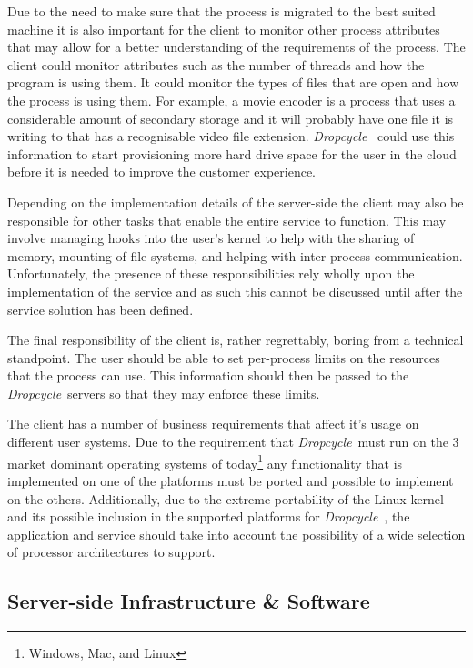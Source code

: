 \documentclass[12pt, a4paper]{article}
\def\dropcycle{\emph{Dropcycle}\ }
\begin{document}
Due to the need to make sure that the process is migrated to the best suited
machine it is also important for the client to monitor other process attributes
that may allow for a better understanding of the requirements of the process.
The client could monitor attributes such as the number of threads and how the
program is using them. It could monitor the types of files that are open and
how the process is using them. For example, a movie encoder is a process that
uses a considerable amount of secondary storage and it will probably have one
file it is writing to that has a recognisable video file extension. \dropcycle
could use this information to start provisioning more hard drive space for the
user in the cloud before it is needed to improve the customer experience.

Depending on the implementation details of the server-side the client may also
be responsible for other tasks that enable the entire service to function. This
may involve managing hooks into the user's kernel to help with the sharing of
memory, mounting of file systems, and helping with inter-process communication.
Unfortunately, the presence of these responsibilities rely wholly upon the
implementation of the service and as such this cannot be discussed until after
the service solution has been defined.

The final responsibility of the client is, rather regrettably, boring from
a technical standpoint. The user should be able to set per-process limits on
the resources that the process can use. This information should then be passed
to the \dropcycle servers so that they may enforce these limits.

The client has a number of business requirements that affect it's usage on
different user systems. Due to the requirement that \dropcycle must run on the
3 market dominant operating systems of today\footnote{Windows, Mac, and Linux}
any functionality that is implemented on one of the platforms must be ported
and possible to implement on the others. Additionally, due to the extreme
portability of the Linux kernel and its possible inclusion in the supported
platforms for \dropcycle, the application and service should take into account
the possibility of a wide selection of processor architectures to support.

\subsection{Server-side Infrastructure \& Software}
\end{document}
